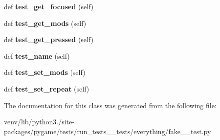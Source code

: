 \begin{DoxyCompactItemize}
\item 
\mbox{\label{classpygame_1_1tests_1_1run__tests____tests_1_1everything_1_1fake__2__test_1_1_key_module_test_a7baa37ec0ac0642e49ee994b3e875b80}} 
def {\bfseries test\+\_\+get\+\_\+focused} (self)
\item 
\mbox{\label{classpygame_1_1tests_1_1run__tests____tests_1_1everything_1_1fake__2__test_1_1_key_module_test_adc6474575cf3c268fcdc9b4ed7bf9779}} 
def {\bfseries test\+\_\+get\+\_\+mods} (self)
\item 
\mbox{\label{classpygame_1_1tests_1_1run__tests____tests_1_1everything_1_1fake__2__test_1_1_key_module_test_a42e6053b8b462d4532340300d0dc635c}} 
def {\bfseries test\+\_\+get\+\_\+pressed} (self)
\item 
\mbox{\label{classpygame_1_1tests_1_1run__tests____tests_1_1everything_1_1fake__2__test_1_1_key_module_test_a0262dd6dfa9f93d34ae4c2b3eaeb107a}} 
def {\bfseries test\+\_\+name} (self)
\item 
\mbox{\label{classpygame_1_1tests_1_1run__tests____tests_1_1everything_1_1fake__2__test_1_1_key_module_test_ab5338f88a33717daa6f4e6e97ef54327}} 
def {\bfseries test\+\_\+set\+\_\+mods} (self)
\item 
\mbox{\label{classpygame_1_1tests_1_1run__tests____tests_1_1everything_1_1fake__2__test_1_1_key_module_test_acd52013384be8bce6be10a4305ec6689}} 
def {\bfseries test\+\_\+set\+\_\+repeat} (self)
\end{DoxyCompactItemize}


The documentation for this class was generated from the following file\+:\begin{DoxyCompactItemize}
\item 
venv/lib/python3./site-\/packages/pygame/tests/run\+\_\+tests\+\_\+\+\_\+tests/everything/fake\+\_\+\_\+test.\+py\end{DoxyCompactItemize}
